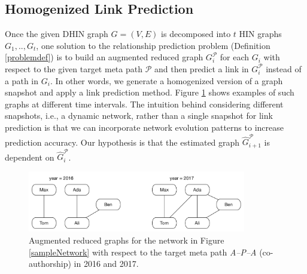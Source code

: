 
\subsection{Homogenized Link Prediction}\label{def:HLP}

Once the given DHIN graph $G=(V,E)$ is decomposed into $t$ HIN graphs $G_1, .., G_t$, one solution to the relationship prediction problem (Definition \ref{problemdef}) is to build an augmented reduced graph $G_i^\mathcal{P}$ for each $G_i$ with respect to the given target meta path $\mathcal{P}$ and then predict a link in $G_i^\mathcal{P}$ instead of a path in $G_i$. In other words, we generate a homogenized version of a graph snapshot and apply a link prediction method. Figure \ref{targetARG} shows examples of such graphs at different time intervals. The intuition behind considering different snapshots, i.e., a dynamic network, rather than a single snapshot for link prediction is that we can incorporate network evolution patterns to increase prediction accuracy. Our hypothesis is that the estimated graph $\hat{G}_{i+1}^\mathcal{P}$ is dependent on $\hat{G}_i^\mathcal{P}$. 

\begin{figure}[t]
\centering
\includegraphics[trim = 0mm 5mm 0mm 5mm,width=0.85\textwidth]{figs/exampletargetARG.pdf}
\caption{Augmented reduced graphs for the network in Figure \ref{sampleNetwork} with respect to the target meta path \textit{A--P--A} (co-authorship) in 2016 and 2017.}\label{targetARG}
\end{figure}


